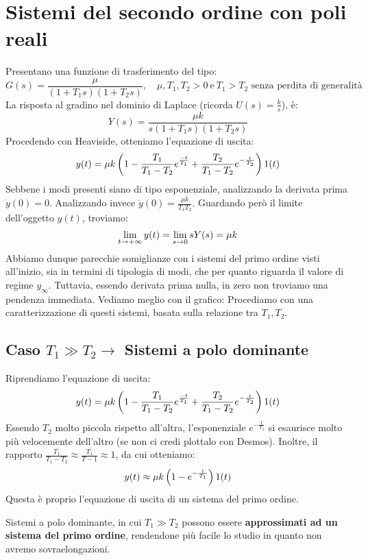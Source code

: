 \section{Sistemi del secondo ordine con poli reali}
Presentano una funzione di trasferimento del tipo:
\begin{equation}
G(s) = \frac{\mu}{(1+T_1s)(1+T_2s)}, \quad \mu, T_1, T_2 > 0 \ \textrm{e} \ T_1 > T_2 \textrm{ senza perdita di generalità}
\end{equation}
La risposta al gradino nel dominio di Laplace (ricorda $U(s) = \frac{k}{s}$), è:
\begin{equation*}
Y(s) = \frac{\mu k}{s(1+T_1 s) (1+T_2s)}
\end{equation*}
Procedendo con Heaviside, otteniamo l'equazione di uscita:
\begin{equation}
y(t) = \mu k\left( 1 - \frac{T_1}{T_1 - T_2}e^{\frac{-t}{T_1}} + \frac{T_2}{T_1-T_2}e^{-\frac{t}{T_2}} \right)1(t)
\end{equation}
Sebbene i modi presenti siano di tipo esponenziale, analizzando la derivata prima $\dot y(0) = 0$. Analizzando invece $\ddot y(0) = \frac{\mu k}{T_1T_2}$. Guardando però il limite dell'oggetto $y(t)$, troviamo:
\begin{equation}
\lim_{t \rightarrow +\infty} y(t) = \lim_{s \rightarrow 0} sY(s) = \mu k
\end{equation}
Abbiamo dunque parecchie somiglianze con i sistemi del primo ordine visti all'inizio, sia in termini di tipologia di modi, che per quanto riguarda il valore di regime $y_\infty$. Tuttavia, essendo derivata prima nulla, in zero non troviamo una pendenza immediata. Vediamo meglio con il grafico:
\bb
Procediamo con una caratterizzazione di questi sistemi, basata sulla relazione tra $T_1, T_2$.

\subsection{Caso $T_1 \gg T_2 \rightarrow $ Sistemi a polo dominante}
Riprendiamo l'equazione di uscita:
\begin{equation*}
y(t) = \mu k\left( 1 - \frac{T_1}{T_1 - T_2}e^{\frac{-t}{T_1}} + \frac{T_2}{T_1-T_2}e^{-\frac{t}{T_2}} \right)1(t)
\end{equation*}
Essendo $T_2$ molto piccola rispetto all'altra, l'esponenziale $e^{-\frac{t}{T_2}}$ si esaurisce molto più velocemente dell'altro (se non ci credi plottalo con Desmos). Inoltre, il rapporto $\frac{T_1}{T_1 - T_2} \approx \frac{T_1}{T-1} \approx 1$, da cui otteniamo:
\begin{equation}
y(t) \approx \mu k \left( 1-e^{-\frac{t}{T_1}} \right)1(t)
\end{equation}
Questa è proprio l'equazione di uscita di un sistema del primo ordine.
\begin{defin}{}{}
Sistemi a polo dominante, in cui $T_1 \gg T_2$ possono essere \textbf{approssimati ad un sistema del primo ordine}, rendendone più facile lo studio in quanto non avremo sovraelongazioni.
\end{defin}

